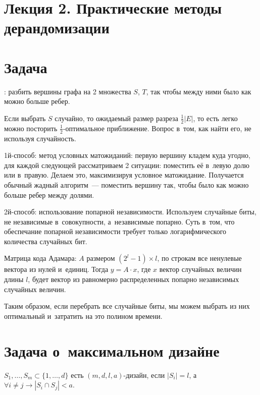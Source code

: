 \documentclass{article}
\begin{document}
\section*{Лекция 2. Практические методы дерандомизации}
\resetcntrs

\section{Задача }

: разбить вершины графа на 2 множества $S$, $T$, так чтобы между
ними было как можно больше ребер.

Если выбрать $S$ случайно, то ожидаемый размер разреза $\frac{1}{2}|E|$, то есть
легко можно посторить $\frac{1}{2}$-оптимальное приближение. Вопрос в~том, как
найти его, не используя случайность.

1й-способ: метод условных матожиданий: первую вершину кладем куда угодно, для
каждой следующей рассматриваем 2 ситуации: поместить её в~левую долю или
в~правую. Делаем это, максимизируя условное матожидание. Получается обычный
жадный алгоритм~--- поместить вершину так, чтобы было как можно больше ребер
между долями.

2й-способ: использование попарной независимости. Используем случайные биты, не
независимые в~совокупности, а~независимые попарно. Суть в~том, что обеспечание
попарной независимости требует только логарифмического количества случайных бит.

Матрица кода Адамара: $A$ размером $(2^l-1)\times l$, по строкам все ненулевые
вектора из нулей и~единиц. Тогда $y = A \cdot x$, где $x$ вектор случайных
величин длины $l$, будет вектор из равномерно распределенных попарно независимых
случайных величин.

Таким образом, если перебрать все случайные биты, мы можем выбрать из них
оптимальный и~затратить на это полином времени.

\section{Задача о~максимальном дизайне}

\begin{definition}
	$S_1, \ldots, S_m \subset \{1, \ldots, d\}$ есть $(m, d, l, a)$-дизайн,
	если $|S_i| = l$, а~$\forall i \ne j \rightarrow |S_i \cap S_j| < a$.
\end{definition}
\end{document}
